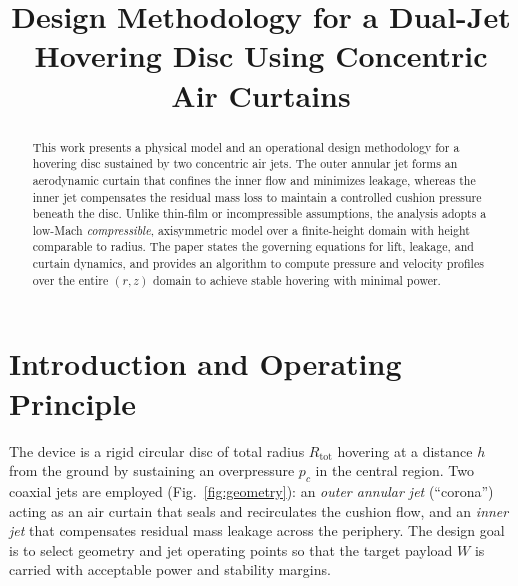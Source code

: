 \documentclass[11pt,a4paper]{article}
\title{Design Methodology for a Dual-Jet Hovering Disc Using Concentric Air Curtains}
\author{ }
\date{ }
\begin{document}
\maketitle

\begin{abstract}
This work presents a physical model and an operational design methodology for a hovering disc sustained by two concentric air jets. The outer annular jet forms an aerodynamic curtain that confines the inner flow and minimizes leakage, whereas the inner jet compensates the residual mass loss to maintain a controlled cushion pressure beneath the disc. Unlike thin-film or incompressible assumptions, the analysis adopts a low-Mach \emph{compressible}, axisymmetric model over a finite-height domain with height comparable to radius. The paper states the governing equations for lift, leakage, and curtain dynamics, and provides an algorithm to compute pressure and velocity profiles over the entire $(r,z)$ domain to achieve stable hovering with minimal power.
\end{abstract}

\section{Introduction and Operating Principle}
The device is a rigid circular disc of total radius $R_{\text{tot}}$ hovering at a distance $h$ from the ground by sustaining an overpressure $p_c$ in the central region. Two coaxial jets are employed (Fig.~\ref{fig:geometry}): an \emph{outer annular jet} (``corona'') acting as an air curtain that seals and recirculates the cushion flow, and an \emph{inner jet} that compensates residual mass leakage across the periphery. The design goal is to select geometry and jet operating points so that the target payload $W$ is carried with acceptable power and stability margins.
\end{document}
